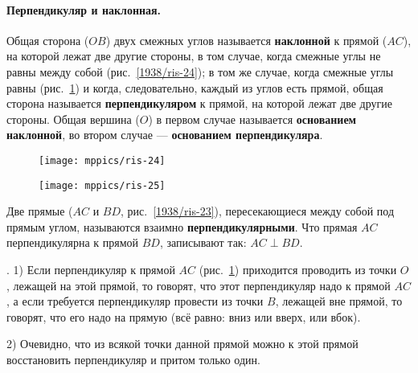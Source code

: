\paragraph{Перпендикуляр и наклонная.}\label{1938/23}
Общая сторона ($OB$) двух смежных углов называется \textbf{наклонной} к прямой ($AC$), на которой лежат две другие стороны, в том случае, когда смежные углы не равны между собой (рис.~\ref{1938/ris-24});
в том же случае, когда смежные углы равны (рис.~\ref{1938/ris-25}) и когда, следовательно, каждый из углов есть прямой, общая сторона называется \textbf{перпендикуляром} к прямой, на которой лежат две другие стороны.
Общая вершина ($O$) в первом случае называется \textbf{основанием наклонной}, во втором случае — \textbf{основанием перпендикуляра}.

\begin{figure}[!ht]
\begin{minipage}{.48\textwidth}
\centering
\texttt{[image: mppics/ris-24]}
\end{minipage}\hfill
\begin{minipage}{.48\textwidth}
\centering
\texttt{[image: mppics/ris-25]}
\end{minipage}

\medskip

\begin{minipage}{.48\textwidth}
\centering
\caption{}\label{1938/ris-24}
\end{minipage}\hfill
\begin{minipage}{.48\textwidth}
\centering
\caption{}\label{1938/ris-25}
\end{minipage}
\vskip-4mm
\end{figure}

Две прямые ($AC$ и $BD$, рис.~\ref{1938/ris-23}), пересекающиеся между собой под прямым углом, называются взаимно \textbf{перпендикулярными}.
Что прямая $AC$ перпендикулярна к прямой $BD$, записывают так: $AC\perp BD$.

{\small

\smallskip

\mbox{.}
1) Если перпендикуляр к прямой $AC$ (рис.~\ref{1938/ris-25}) приходится проводить из точки $O$, лежащей на этой прямой, то говорят, что этот перпендикуляр надо   к прямой $AC$, а если требуется перпендикуляр провести из точки $B$, лежащей вне прямой, то говорят, что его надо  на прямую (всё равно: вниз или вверх, или вбок).

2) Очевидно, что из всякой точки данной прямой можно к этой прямой восстановить перпендикуляр и притом только один.

}

